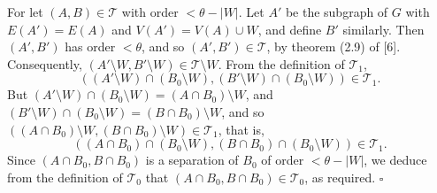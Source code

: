 For let $(A, B) \in \mathcal{T}$ with order $< \theta - |W|$. Let $A'$ be the subgraph of $G$ with $E(A') = E(A)$ and $V(A') = V(A) \cup W$, and define $B'$ similarly. Then $(A', B')$ has order $< \theta$, and so $(A', B') \in \mathcal{T}$, by theorem (2.9) of [6]. Consequently, $(A' \setminus W, B' \setminus W) \in \mathcal{T} \setminus W$. From the definition of $\mathcal{T}_1$,
\begin{equation*}
((A' \setminus W) \cap (B_0 \setminus W), (B' \setminus W) \cap (B_0 \setminus W)) \in \mathcal{T}_1.
\end{equation*}
But $(A' \setminus W) \cap (B_0 \setminus W) = (A \cap B_0) \setminus W$, and $(B' \setminus W) \cap (B_0 \setminus W) = (B \cap B_0) \setminus W$, and so $((A \cap B_0) \setminus W, (B \cap B_0) \setminus W) \in \mathcal{T}_1$, that is,
\begin{equation*}
((A \cap B_0) \cap (B_0 \setminus W), (B \cap B_0) \cap (B_0 \setminus W)) \in \mathcal{T}_1.
\end{equation*}
Since $(A \cap B_0, B \cap B_0)$ is a separation of $B_0$ of order $< \theta - |W|$, we deduce from the definition of $\mathcal{T}_0$ that $(A \cap B_0, B \cap B_0) \in \mathcal{T}_0$, as required. $\square$
